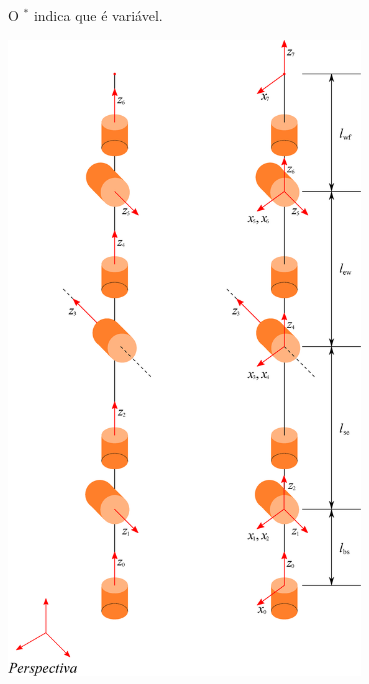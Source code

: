 \documentclass[aspectratio=169]{beamer}
\begin{document}
\begin{frame}
\begin{minipage}{0.58\textwidth}
\begin{table}[h]
O $^*$ indica que é variável.
\end{table}
\end{minipage}
\hfill
\begin{minipage}{0.38\textwidth}
    \includegraphics[width=0.7\textwidth]{Fig/x.eps}
\end{minipage}
\end{frame}

\end{document}
